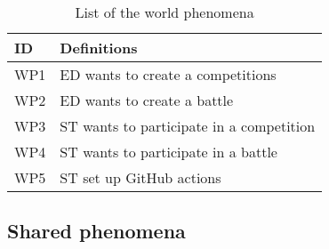 \begin{table}[H]
  \begin{tabular}{|l|l|}

    \hline
    \textbf{ID} & \textbf{Definitions}      \\
    \hline
    WP1 & ED wants to create a competitions \\
    \hline
    WP2 & ED wants to create a battle \\
    \hline
    WP3 & ST wants to participate in a competition \\
    \hline
    WP4 & ST wants to participate in a battle     \\
    \hline
    WP5 & ST set up GitHub actions    \\
    \hline
    
  \end{tabular}
  \caption{List of the world phenomena}
  \label{tab:worldPhenomena}
\end{table}

\subsection{Shared phenomena}
\label{ss:shared_phenomena}%

